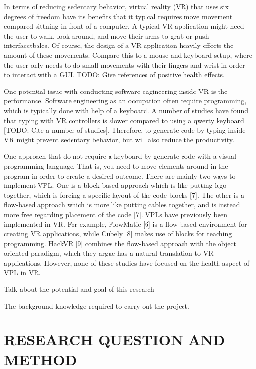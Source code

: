 \documentclass{sigchi}
\begin{document}
In terms of reducing sedentary behavior, virtual reality (VR) that uses six degrees of freedom have its benefits that it typical requires move movement compared sittning in front of a computer. A typical VR-application might need the user to walk, look around, and move their arms to grab or push interfacetbales. Of course, the design of a VR-application heavily effects the amount of these movements. Compare this to a mouse and keyboard setup, where the user only needs to do small movements with their fingers and wrist in order to interact with a GUI. TODO: Give references of positive health effects.

One potential issue with conducting software engineering inside VR is the performance. Software engineering as an occupation often require programming, which is typically done with help of a keyboard. A number of studies have found that typing with VR controllers is slower compared to using a qwerty keyboard [TODO: Cite a number of studies]. Therefore, to generate code by typing inside VR might prevent sedentary behavior, but will also reduce the productivity.

One approach that do not require a keyboard by generate code with a visual programming language. That is, you need to move elements around in the program in order to create a desired outcome. There are mainly two ways to implement VPL. One is a block-based approach which is like putting lego together, which is forcing a specific layout of the code blocks [7]. The other is a flow-based approach which is more like putting cables together, and is instead more free regarding placement of the code [7]. VPLs have previously been implemented in VR. For example, FlowMatic [6] is a flow-based environment for creating VR applications, while Cubely [8] makes use of blocks for teaching programming. HackVR [9] combines the flow-based approach with the object oriented paradigm, which they argue has a natural translation to VR applications. However, none of these studies have focused on the health aspect of VPL in VR.



Talk about the potential and goal of this research

The background knowledge required to carry out the project.

\section{RESEARCH QUESTION AND METHOD}
\end{document}

